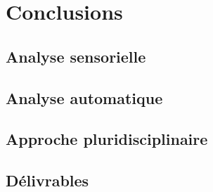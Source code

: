 \chapter{Conclusions}\label{ch:end_conc}

\section{Analyse sensorielle}

\section{Analyse automatique}

\section{Approche pluridisciplinaire}

\section{Délivrables}





